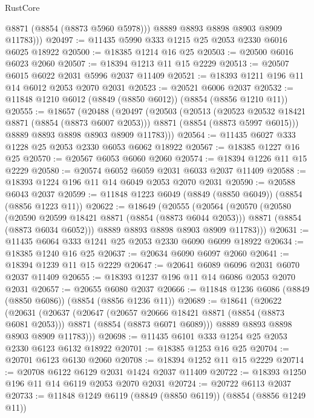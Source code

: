 \begin{lexlean}{RustCore}
\begin{coremodule}
            @8871
            (@8854 (@8873 @5960 @5978)))
          @8889
          @8893
          @8898
          @8903
          @8909
          @11783)))
@20497 := @11435 @5990 @333 @1215 @25 @2053 @2330 @6016 @6025 @18922
@20500 := @18385 @1214 @16 @25
@20503 := @20500 @6016 @6023 @2060
@20507 := @18394 @1213 @11 @15 @2229
@20513 := @20507 @6015 @6022 @2031 @5996 @2037 @11409
@20521 := @18393 @1211 @196 @11 @14 @6012 @2053 @2070 @2031
@20523 := @20521 @6006 @2037
@20532 := @11848 @1210 @6012 (@8849 (@8850 @6012)) (@8854 (@8856 @1210 @11))
@20555 := @18657
    (@20488
      (@20497
        (@20503
          (@20513
            (@20523 @20532 @18421 @8871 (@8854 (@8873 @6007 @2053)))
            @8871
            (@8854 (@8873 @5997 @6015)))
          @8889
          @8893
          @8898
          @8903
          @8909
          @11783)))
@20564 := @11435 @6027 @333 @1228 @25 @2053 @2330 @6053 @6062 @18922
@20567 := @18385 @1227 @16 @25
@20570 := @20567 @6053 @6060 @2060
@20574 := @18394 @1226 @11 @15 @2229
@20580 := @20574 @6052 @6059 @2031 @6033 @2037 @11409
@20588 := @18393 @1224 @196 @11 @14 @6049 @2053 @2070 @2031
@20590 := @20588 @6043 @2037
@20599 := @11848 @1223 @6049 (@8849 (@8850 @6049)) (@8854 (@8856 @1223 @11))
@20622 := @18649
    (@20555
      (@20564
        (@20570
          (@20580
            (@20590 @20599 @18421 @8871 (@8854 (@8873 @6044 @2053)))
            @8871
            (@8854 (@8873 @6034 @6052)))
          @8889
          @8893
          @8898
          @8903
          @8909
          @11783)))
@20631 := @11435 @6064 @333 @1241 @25 @2053 @2330 @6090 @6099 @18922
@20634 := @18385 @1240 @16 @25
@20637 := @20634 @6090 @6097 @2060
@20641 := @18394 @1239 @11 @15 @2229
@20647 := @20641 @6089 @6096 @2031 @6070 @2037 @11409
@20655 := @18393 @1237 @196 @11 @14 @6086 @2053 @2070 @2031
@20657 := @20655 @6080 @2037
@20666 := @11848 @1236 @6086 (@8849 (@8850 @6086)) (@8854 (@8856 @1236 @11))
@20689 := @18641
    (@20622
      (@20631
        (@20637
          (@20647
            (@20657 @20666 @18421 @8871 (@8854 (@8873 @6081 @2053)))
            @8871
            (@8854 (@8873 @6071 @6089)))
          @8889
          @8893
          @8898
          @8903
          @8909
          @11783)))
@20698 := @11435 @6101 @333 @1254 @25 @2053 @2330 @6123 @6132 @18922
@20701 := @18385 @1253 @16 @25
@20704 := @20701 @6123 @6130 @2060
@20708 := @18394 @1252 @11 @15 @2229
@20714 := @20708 @6122 @6129 @2031 @1424 @2037 @11409
@20722 := @18393 @1250 @196 @11 @14 @6119 @2053 @2070 @2031
@20724 := @20722 @6113 @2037
@20733 := @11848 @1249 @6119 (@8849 (@8850 @6119)) (@8854 (@8856 @1249 @11))

\end{coremodule}
\end{lexlean}
